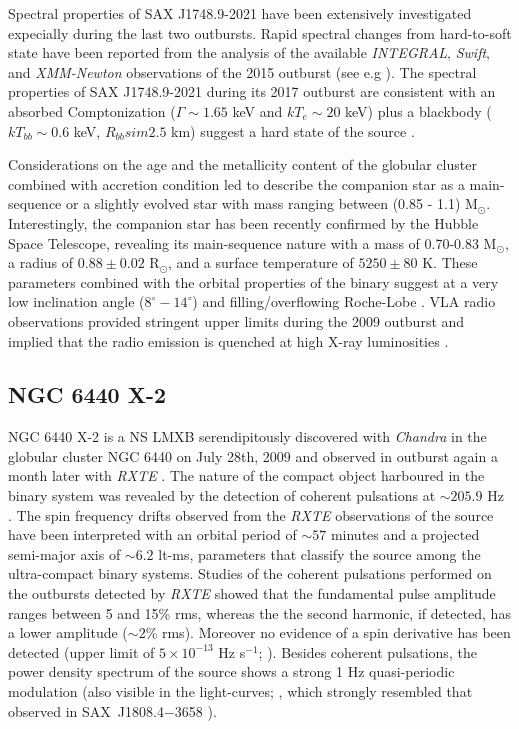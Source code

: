 \documentclass[graybox]{svmult}
\def \inte {{\em INTEGRAL\xspace}}
\def \swift {{\em Swift\xspace}}
\def \chandra {{\em Chandra\xspace}}
\def \xmm {{\em XMM-Newton\xspace}}
\def \rxte {{\em RXTE\xspace}}
\def \saxj{{\rm SAX~J1808.4$-$3658\xspace}}
\begin{document}
Spectral properties of SAX J1748.9-2021 have been extensively investigated expecially during the last two outbursts. Rapid spectral changes from hard-to-soft state have been reported from the analysis of the available \inte{}, \swift{}, and \xmm{} observations of the 2015 outburst (see e.g \cite{Li2018,Pintore2016}). The spectral properties of SAX J1748.9-2021 during its 2017 outburst are consistent with an absorbed Comptonization ($\Gamma\sim 1.65$ keV and $kT_e\sim 20$ keV) plus a blackbody ($kT_{bb}\sim0.6$ keV, $R_{bb}sim2.5$ km) suggest a hard state of the source \cite{Pintore2018}.
 
Considerations on the age and the metallicity content of the globular cluster combined with accretion condition led \cite{Altamirano2008} to describe the companion star as a main-sequence or a slightly evolved star with mass ranging between (0.85 - 1.1) M$_\odot$. Interestingly, the companion star has been recently confirmed by the Hubble Space Telescope, revealing its main-sequence nature with a mass of 0.70-0.83 M$_\odot$, a radius of $0.88\pm0.02$ R$_\odot$, and a surface temperature of $5250\pm80$ K. These parameters combined with the orbital properties of the binary suggest at a very low inclination angle ($8^\circ-14^\circ$) and filling/overflowing Roche-Lobe \cite{Cadelano2017}. VLA radio observations provided stringent upper limits during the 2009 outburst and implied that the radio emission is quenched at high X-ray luminosities \cite{MillerJones2010b}.


\subsection{NGC 6440 X-2}

NGC 6440 X-2 is a NS LMXB serendipitously discovered with \chandra{} in the globular cluster NGC 6440 on July 28th, 2009 \cite{Heinke2009a} and observed in outburst again a month later with \rxte{} \cite{Altamirano2010b}. The nature of the compact object harboured in the binary system was revealed by the detection of coherent pulsations at $\sim205.9$ Hz \cite{Altamirano2009}. The spin frequency drifts observed from the \rxte{} observations of the source have been interpreted with an orbital period of $\sim57$ minutes and a projected semi-major axis of $\sim6.2$ lt-ms, parameters that classify the source among the ultra-compact binary systems. Studies of the coherent pulsations performed on the outbursts detected by \rxte{} showed that the fundamental pulse amplitude ranges between 5 and 15\% rms, whereas the the second harmonic, if detected, has a lower amplitude ($\sim2$\% rms). Moreover no evidence of a spin derivative has been detected (upper limit of $5\times 10^{-13}$ Hz s$^{-1}$; \cite{Bult2015c}). Besides coherent pulsations, the power density spectrum of the source shows a strong 1 Hz quasi-periodic modulation (also visible in the light-curves; \cite{Patruno2013}, which strongly resembled that observed in \saxj{} \cite{Patruno2009c,vanderKlis2000}).
\end{document}

